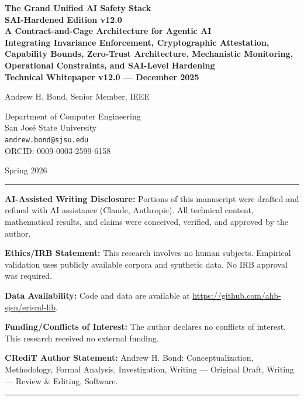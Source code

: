 \documentclass[12pt,letterpaper]{article}
\begin{document}
\begin{titlepage}
\centering
\vspace*{2cm}

{\LARGE\bfseries The Grand Unified AI Safety Stack\\
 SAI-Hardened Edition v12.0\\
 A Contract-and-Cage Architecture for Agentic AI\\
 Integrating Invariance Enforcement, Cryptographic Attestation,\\
Capability Bounds, Zero-Trust Architecture, Mechanistic Monitoring,\\
Operational Constraints, and SAI-Level Hardening\\
Technical Whitepaper v12.0 --- December 2025\par}

\vspace{2cm}

{\large Andrew H. Bond, Senior Member, IEEE\par}
\vspace{0.5cm}
{\normalsize Department of Computer Engineering\\
San Jos\'{e} State University\\
\texttt{andrew.bond@sjsu.edu}\\
ORCID: 0009-0003-2599-6158\par}

\vspace{1cm}

{\normalsize Spring 2026\par}

\vfill

\noindent\rule{\textwidth}{0.4pt}
\small

\noindent\textbf{AI-Assisted Writing Disclosure:} Portions of this manuscript were drafted and refined with AI assistance (Claude, Anthropic). All technical content, mathematical results, and claims were conceived, verified, and approved by the author.

\vspace{0.5em}
\noindent\textbf{Ethics/IRB Statement:} This research involves no human subjects. Empirical validation uses publicly available corpora and synthetic data. No IRB approval was required.

\vspace{0.5em}
\noindent\textbf{Data Availability:} Code and data are available at \url{https://github.com/ahb-sjsu/erisml-lib}.

\vspace{0.5em}
\noindent\textbf{Funding/Conflicts of Interest:} The author declares no conflicts of interest. This research received no external funding.

\vspace{0.5em}
\noindent\textbf{CRediT Author Statement:} Andrew H. Bond: Conceptualization, Methodology, Formal Analysis, Investigation, Writing --- Original Draft, Writing --- Review \& Editing, Software.

\normalsize
\noindent\rule{\textwidth}{0.4pt}

\end{titlepage}
\end{document}
